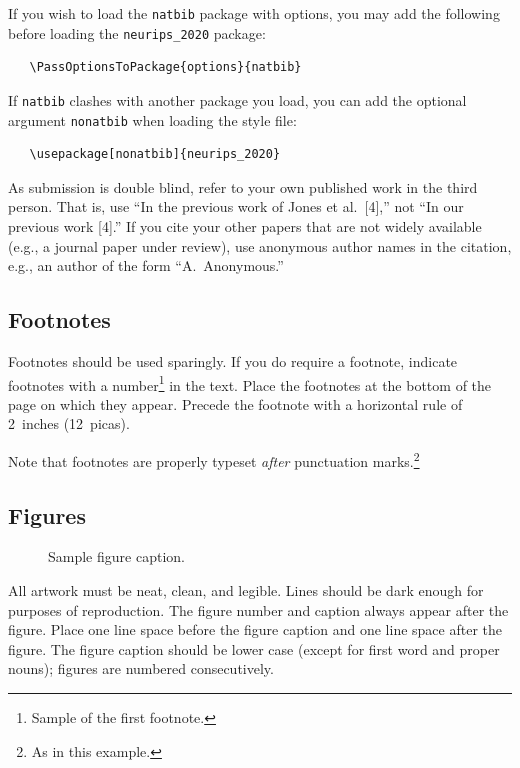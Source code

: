 \documentclass{article}
\begin{document}
If you wish to load the \verb+natbib+ package with options, you may add the
following before loading the \verb+neurips_2020+ package:
\begin{verbatim}
   \PassOptionsToPackage{options}{natbib}
\end{verbatim}

If \verb+natbib+ clashes with another package you load, you can add the optional
argument \verb+nonatbib+ when loading the style file:
\begin{verbatim}
   \usepackage[nonatbib]{neurips_2020}
\end{verbatim}

As submission is double blind, refer to your own published work in the third
person. That is, use ``In the previous work of Jones et al.\ [4],'' not ``In our
previous work [4].'' If you cite your other papers that are not widely available
(e.g., a journal paper under review), use anonymous author names in the
citation, e.g., an author of the form ``A.\ Anonymous.''

\subsection{Footnotes}

Footnotes should be used sparingly.  If you do require a footnote, indicate
footnotes with a number\footnote{Sample of the first footnote.} in the
text. Place the footnotes at the bottom of the page on which they appear.
Precede the footnote with a horizontal rule of 2~inches (12~picas).

Note that footnotes are properly typeset \emph{after} punctuation
marks.\footnote{As in this example.}

\subsection{Figures}

\begin{figure}
  \centering
  \fbox{\rule[-.5cm]{0cm}{4cm} \rule[-.5cm]{4cm}{0cm}}
  \caption{Sample figure caption.}
\end{figure}

All artwork must be neat, clean, and legible. Lines should be dark enough for
purposes of reproduction. The figure number and caption always appear after the
figure. Place one line space before the figure caption and one line space after
the figure. The figure caption should be lower case (except for first word and
proper nouns); figures are numbered consecutively.
\end{document}
